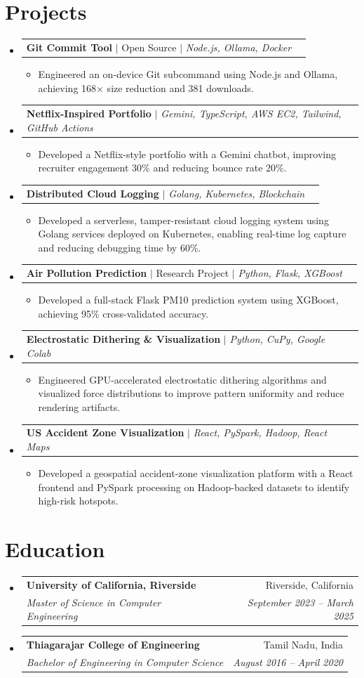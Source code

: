 \documentclass[letterpaper,11pt]{article}
\makeatletter
\newcommand{\resumeItem}[1]{
  \item\small{
    {#1 \vspace{-2pt}}
  }
}
\newcommand{\resumeSubheading}[4]{
  \vspace{-2pt}\item
    \begin{tabular*}{0.97\textwidth}[t]{l@{\extracolsep{\fill}}r}
      \textbf{#1} & #2 \\
      \textit{\small#3} & \textit{\small #4} \\
    \end{tabular*}\vspace{-7pt}
}
\newcommand{\resumeProjectHeading}[2]{
    \item
    \begin{tabular*}{0.97\textwidth}{l@{\extracolsep{\fill}}r}
      \small#1 & #2 \\
    \end{tabular*}\vspace{-7pt}
}
\newcommand{\resumeSubHeadingListStart}{\begin{itemize}[leftmargin=0.15in, label={}]}
\newcommand{\resumeSubHeadingListEnd}{\end{itemize}}
\newcommand{\resumeItemListStart}{\begin{itemize}}
\newcommand{\resumeItemListEnd}{\end{itemize}\vspace{-5pt}}
\makeatother
\begin{document}
\section{Projects}
    \resumeSubHeadingListStart
      \resumeProjectHeading
          {\textbf{Git Commit Tool} $|$ Open Source $|$ \emph{Node.js, Ollama, Docker}}{}
          \resumeItemListStart
            \resumeItem{Engineered an on-device Git subcommand using Node.js and Ollama, achieving 168$\times$ size reduction and 381 downloads.}
          \resumeItemListEnd
      \resumeProjectHeading
          {\textbf{Netflix-Inspired Portfolio} $|$ \emph{Gemini, TypeScript, AWS EC2, Tailwind, GitHub Actions}}{}
          \resumeItemListStart
            \resumeItem{Developed a Netflix-style portfolio with a Gemini chatbot, improving recruiter engagement 30\% and reducing bounce rate 20\%.}
          \resumeItemListEnd
      \resumeProjectHeading
          {\textbf{Distributed Cloud Logging} $|$ \emph{Golang, Kubernetes, Blockchain}}{}
          \resumeItemListStart
            \resumeItem{Developed a serverless, tamper-resistant cloud logging system using Golang services deployed on Kubernetes, enabling real-time log capture and reducing debugging time by 60\%.}
          \resumeItemListEnd
      \resumeProjectHeading
          {\textbf{Air Pollution Prediction} $|$ Research Project $|$ \emph{Python, Flask, XGBoost}}{}
          \resumeItemListStart
            \resumeItem{Developed a full-stack Flask PM10 prediction system using XGBoost, achieving 95\% cross-validated accuracy.}
          \resumeItemListEnd
      \resumeProjectHeading
          {\textbf{Electrostatic Dithering \& Visualization} $|$ \emph{Python, CuPy, Google Colab}}{}
          \resumeItemListStart
            \resumeItem{Engineered GPU-accelerated electrostatic dithering algorithms and visualized force distributions to improve pattern uniformity and reduce rendering artifacts.}
          \resumeItemListEnd
      \resumeProjectHeading
          {\textbf{US Accident Zone Visualization} $|$ \emph{React, PySpark, Hadoop, React Maps}}{}
          \resumeItemListStart
            \resumeItem{Developed a geospatial accident-zone visualization platform with a React frontend and PySpark processing on Hadoop-backed datasets to identify high-risk hotspots.}
          \resumeItemListEnd
    \resumeSubHeadingListEnd



%
\section{Education}
  \resumeSubHeadingListStart
    \resumeSubheading
      {University of California, Riverside}{Riverside, California}
      {Master of Science in Computer Engineering}{September 2023 -- March 2025}
    \resumeSubheading
      {Thiagarajar College of Engineering}{Tamil Nadu, India}
      {Bachelor of Engineering in Computer Science}{August 2016 -- April 2020}
  \resumeSubHeadingListEnd


\end{document}
